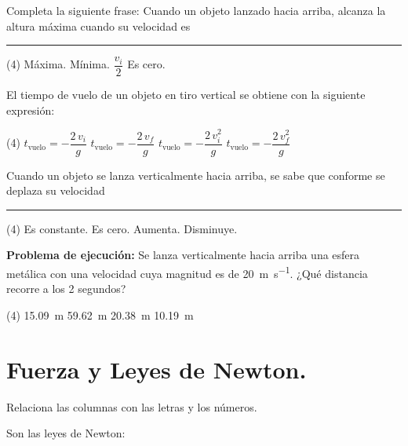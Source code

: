 \documentclass[12pt, letter]{exam}
\begin{document}
\begin{questions}
    \question Completa la siguiente frase: Cuando un objeto lanzado hacia arriba, alcanza la altura máxima cuando su velocidad es \rule{2cm}{0.3mm}
    \begin{tasks}(4)
        \task Máxima.
        \task Mínima.
        \task $\dfrac{v_{i}}{2}$
        \task Es cero.
    \end{tasks}
    \question El tiempo de vuelo de un objeto en tiro vertical se obtiene con la siguiente expresión:
    \begin{tasks}(4)
        \task $t_{\text{vuelo}} = - \dfrac{2 \, v_{i}}{g}$
        \task $t_{\text{vuelo}} = - \dfrac{2 \, v_{f}}{g}$
        \task $t_{\text{vuelo}} = - \dfrac{2 \, v_{i}^{2}}{g}$
        \task $t_{\text{vuelo}} = - \dfrac{2 \, v_{f}^{2}}{g}$
    \end{tasks}
    \question Cuando un objeto se lanza verticalmente hacia arriba, se sabe que conforme se deplaza su velocidad \rule{2cm}{0.3mm}
    \begin{tasks}(4)
        \task Es constante.
        \task Es cero.
        \task Aumenta.
        \task Disminuye.
    \end{tasks}
    \question \label{Problema_03} \textbf{Problema de ejecución: }Se lanza verticalmente hacia arriba una esfera metálica con una velocidad cuya magnitud es de \SI{20}{\meter\per\second}. ¿Qué distancia recorre a los \num{2} segundos?
    \begin{tasks}(4)
        \task \SI{15.09}{\meter}
        \task \SI{59.62}{\meter}
        \task \SI{20.38}{\meter}
        \task \SI{10.19}{\meter}
    \end{tasks}

    \section{Fuerza y Leyes de Newton.}

    \question Relaciona las columnas con las letras y los números.
    
    Son las leyes de Newton:
    
    \begin{minipage}[t]{0.4\linewidth}
\end{minipage}
\end{questions}
\end{document}
